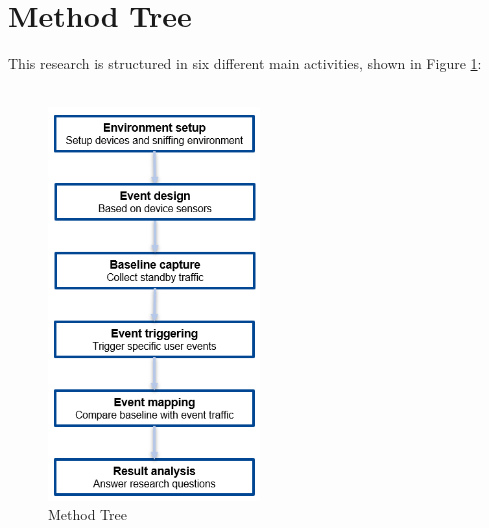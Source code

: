 \section{Method Tree}
This research is structured in six different main activities, shown in Figure \ref{fig:MethodTree}:
\\\\
\begin{figure} [H]
    \centering
    \includegraphics[width=0.5\textwidth]{figures/MethodTree.png}
    \caption{Method Tree}
    \label{fig:MethodTree}
\end{figure}

